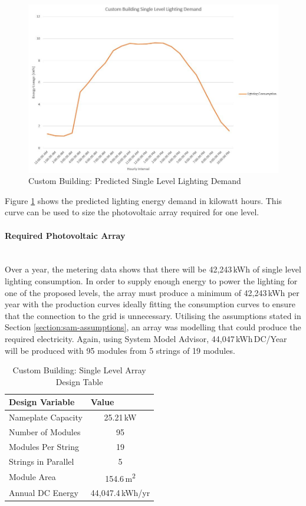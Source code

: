 \begin{figure}[H]
	\hfill\includegraphics[width = 150mm]{images/custom-building/lighting-demand}\hspace*{\fill}
	\caption{Custom Building: Predicted Single Level Lighting Demand} 
	\label{fig:custom-building-lighting-demand}
\end{figure}

Figure \ref{fig:custom-building-lighting-demand} shows the predicted lighting energy demand in kilowatt hours. This curve can be used to size the photovoltaic array required for one level. 

\paragraph{Required Photovoltaic Array}
~\\
Over a year, the metering data shows that there will be 42,243\,kWh of single level lighting consumption. In order to supply enough energy to power the lighting for one of the proposed levels, the array must produce a minimum of 42,243\,kWh per year with the production curves ideally fitting the consumption curves to ensure that the connection to the grid is unnecessary. Utilising the assumptions stated in Section \ref{section:sam-assumptions}, an array was modelling that could produce the required electricity. Again, using System Model Advisor, 44,047\,kWh\,DC/Year will be produced with 95 modules from 5 strings of 19 modules.

\begin{table}[H]
	\centering
	\begin{tabular}{|l|c|}
		\hline
		\textbf{Design Variable} & \multicolumn{1}{l|}{\textbf{Value}} \\ \hline
		Nameplate Capacity & 25.21\,kW \\ \hline
		Number of Modules & 95 \\ \hline
		Modules Per String & 19 \\ \hline
		Strings in Parallel & 5 \\ \hline
		Module Area & 154.6\,\si{m^2} \\ \hline
		Annual DC Energy & 44,047.4\,kWh/yr \\ \hline
	\end{tabular}
	\caption{Custom Building: Single Level Array Design Table}
	\label{table:custom-building}
\end{table} 

